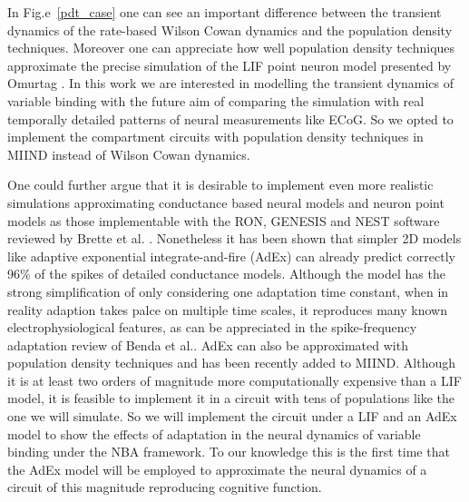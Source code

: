 \documentclass[10pt]{article}
\begin{document}
In Fig.e~\ref{pdt_case} one can see an important difference between
the transient dynamics of the rate-based Wilson Cowan dynamics and the
population density techniques. Moreover one can appreciate how well
population density techniques approximate the precise simulation of
the LIF point neuron model presented by Omurtag
\cite{omurtag2000simulation}. In this work we are interested in
modelling the transient dynamics of variable binding with the future
aim of comparing the simulation with real temporally detailed patterns
of neural measurements like ECoG. So we opted to implement the
compartment circuits with population density techniques in MIIND
instead of Wilson Cowan dynamics.

One could further argue that it is desirable to implement even more
realistic simulations approximating conductance based neural models
and neuron point models as those implementable with the RON, GENESIS
and NEST software reviewed by Brette et al.
\cite{brette2007simulation}. Nonetheless it has been shown that
simpler 2D models like adaptive exponential integrate-and-fire (AdEx)
can already predict correctly 96\% of the spikes of detailed
conductance models\cite{brette2005adaptive}. Although the model has
the strong simplification of only considering one adaptation time
constant, when in reality adaption takes palce on multiple time
scales, it reproduces many known electrophysiological features, as can
be appreciated in the spike-frequency adaptation review of Benda et
al.\cite{Benda_2003,Benda_2014}. AdEx can also be approximated with
population density techniques and has been recently added to MIIND.
Although it is at least two orders of magnitude more computationally
expensive than a LIF model, it is feasible to implement it in a
circuit with tens of populations like the one we will simulate. So we
will implement the circuit under a LIF and an AdEx model to show the
effects of adaptation in the neural dynamics of variable binding under
the NBA framework. To our knowledge this is the first time that the
AdEx model will be employed to approximate the neural dynamics of a
circuit of this magnitude reproducing cognitive function.
\end{document}
